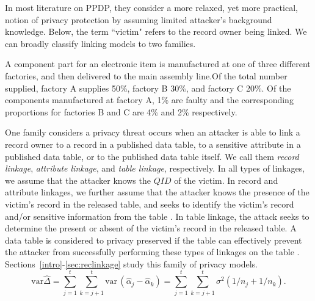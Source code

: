 
In most literature on PPDP, they \cite{jolliffe2002pca} consider a more relaxed, yet more practical, notion of privacy protection by assuming limited attacker's background knowledge. Below, the term ``victim" refers to the record owner being linked. We can broadly classify linking models to two families.

\begin{extract}
A component part for an electronic item is \cite{hyvarinen2001ica}
manufactured at one of three different factories, and then delivered to
the main assembly line.Of the total number supplied, factory A supplies
50\%, factory B 30\%, and factory C 20\%. Of the components
manufactured at factory A, 1\% are faulty and the corresponding
proportions for factories B and C are 4\% and 2\% respectively.
\end{extract}


One family considers a privacy threat occurs when an attacker is able to link a record owner to a record in a published data table, to a sensitive attribute in a published data table, or to the published data table itself. We call them \emph{record linkage}, \emph{attribute linkage}, and \emph{table linkage}, respectively. In all types of linkages, we assume that the attacker knows the $QID$ of the victim. In record and attribute linkages, we further assume that the attacker knows the presence of the victim's record in the released table, and seeks to identify the victim's record and/or sensitive information from the table \cite{yao2002can}. In table linkage, the attack seeks to determine the present or absent of the victim's record in the released table. A data table is considered to privacy preserved if the table can effectively prevent the attacker from successfully performing these types of linkages on the table \cite{madden2002tta}. Sections~\ref{intro}-\ref{sec:reclinkage} study this family of privacy models.
\begin{equation}
\mbox{var}\widehat{\Delta} = \sum_{j = 1}^t \sum_{k = j+1}^t
\mbox{var}\,(\hat{\alpha}_j - \hat{\alpha}_k)  = \sum_{j = 1}^t
\sum_{k = j+1}^t \sigma^2(1/n_j + 1/n_k). \label{2delvart2}
\end{equation}


